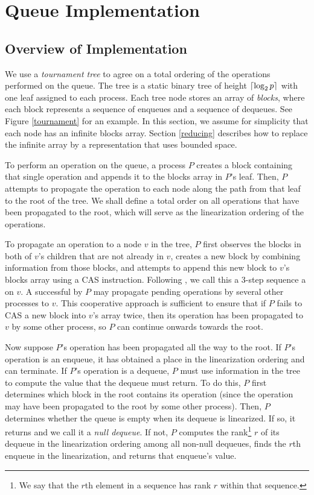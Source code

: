 
\section{Queue Implementation} \label{DescriptQ}

\subsection{Overview of Implementation}
We use a \emph{tournament tree} to agree on a total ordering of the operations performed on the queue.
The tree is a static binary tree of height $\lceil \log_2 p \rceil$ with one leaf 
assigned to each process. 
Each tree node  stores an array of \emph{blocks}, where each block represents a 
sequence of enqueues and a sequence of dequeues.
See Figure \ref{tournament} for an example.
In this section, we assume for simplicity that each node has an infinite blocks array.
Section \ref{reducing} describes how to replace the infinite array by a representation that uses bounded space.


To perform an operation on the queue, a process $P$ creates a block containing that single 
operation and appends it to the blocks array in $P$'s leaf.
Then, $P$ attempts to propagate the operation to each node along the path from that leaf to the root of the tree.
We shall define a total order on all operations that have been propagated to the root, which 
will serve as the linearization ordering of the operations.

To propagate an operation to a node $v$ in the tree, $P$ first observes
the blocks in both of $v$'s children that are not already in $v$,
creates a new block by combining information from those blocks, and attempts to append this 
new block to $v$'s blocks array using a CAS instruction.
Following \cite{}, we call this a 3-step sequence a
 on $v$. %
A successful  by $P$ may propagate pending operations by several other processes to $v$.
This cooperative approach is sufficient to ensure that if $P$ fails to CAS a 
new block into $v$'s array twice,
then its operation has been propagated to $v$ by some other process, so $P$ can continue 
onwards towards the root.

Now suppose $P$'s operation has been propagated all the way to the root.
If $P$'s operation is an enqueue, it has obtained a place in the linearization ordering and can terminate.
If $P$'s operation is a dequeue, $P$ must use information in the tree to compute the value that the
dequeue must return.  To do this, $P$ first determines which block in the root contains its operation
(since the operation may have been propagated to the root by some other process).
Then, $P$ determines whether the queue is empty when its dequeue is linearized. 
If so, it returns  and we call it a \emph{null dequeue}.
If not, $P$ computes the rank\footnote{We say that the $r$th element in a sequence has rank $r$ within that sequence.} $r$ of its dequeue in the linearization ordering
among all non-null dequeues,
finds the $r$th enqueue in the linearization, and returns that enqueue's value.

